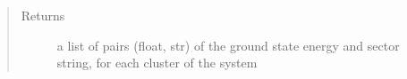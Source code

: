 \documentclass[letterpaper,10pt,english]{sphinxmanual}
\begin{document}

\begin{fulllineitems}
\label{\detokenize{functions:pyqcm.ground_state}}\begin{quote}\begin{description}
\item[{Returns}] \leavevmode
\sphinxAtStartPar
a list of pairs (float, str) of the ground state energy and sector string, for each cluster of the system

\end{description}\end{quote}

\end{fulllineitems}

\end{document}
